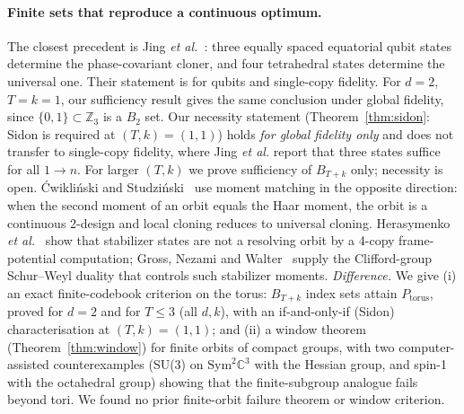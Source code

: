 \documentclass[11pt]{article}
\theoremstyle{definition}
\theoremstyle{remark}
\begin{document}
\paragraph{Finite sets that reproduce a continuous optimum.}
The closest precedent is Jing \emph{et al.}~\cite{Jing2012}: three equally spaced equatorial qubit states determine the phase-covariant cloner, and four tetrahedral states determine the universal one.
Their statement is for qubits and single-copy fidelity.
For $d=2$, $T=k=1$, our sufficiency result gives the same conclusion under global fidelity, since $\{0,1\}\subset\mathbb{Z}_3$ is a $B_2$ set.
Our necessity statement (Theorem~\ref{thm:sidon}: Sidon is required at $(T,k)=(1,1)$) holds \emph{for global fidelity only} and does not transfer to single-copy fidelity, where Jing \emph{et al.} report that three states suffice for all $1\to n$. For larger $(T,k)$ we prove sufficiency of $B_{T+k}$ only; necessity is open.
\'Cwikli\'nski and Studzi\'nski~\cite{CwiklinskiStudzinski2026} use moment matching in the opposite direction: when the second moment of an orbit equals the Haar moment, the orbit is a continuous 2-design and local cloning reduces to universal cloning.
Herasymenko \emph{et al.}~\cite{Herasymenko2026} show that stabilizer states are not a resolving orbit by a 4-copy frame-potential computation; Gross, Nezami and Walter~\cite{GrossNezamiWalter2021} supply the Clifford-group Schur--Weyl duality that controls such stabilizer moments.
\emph{Difference.} We give (i) an exact finite-codebook criterion on the torus: $B_{T+k}$ index sets attain $P_{\mathrm{torus}}$, proved for $d=2$ and for $T\le3$ (all $d,k$), with an if-and-only-if (Sidon) characterisation at $(T,k)=(1,1)$; and (ii) a window theorem (Theorem~\ref{thm:window}) for finite orbits of compact groups, with two computer-assisted counterexamples (SU(3) on $\mathrm{Sym}^2\mathbb{C}^3$ with the Hessian group, and spin-1 with the octahedral group) showing that the finite-subgroup analogue fails beyond tori.
We found no prior finite-orbit failure theorem or window criterion.
\end{document}
